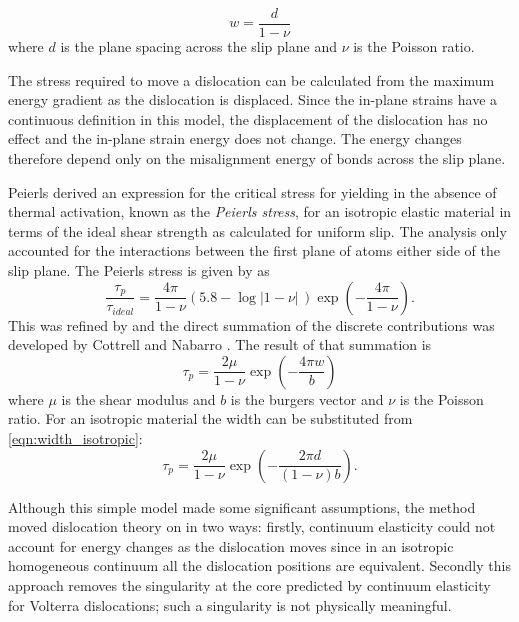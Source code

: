 \begin{equation}
w = \frac{d}{1-\nu}
\label{eqn:width_isotropic}
\end{equation}
where $d$ is the plane spacing across the slip plane and $\nu$ is the Poisson ratio.

The stress required to move a dislocation can be calculated from the maximum energy gradient as the dislocation is displaced. Since the in-plane strains have a continuous definition in this model, the displacement of the dislocation has no effect and the in-plane strain energy does not change. The energy changes therefore depend only on the misalignment energy of bonds across the slip plane.

Peierls derived an expression for the critical stress for yielding in the absence of thermal activation, known as the \emph{Peierls stress}, for an isotropic elastic material in terms of the ideal shear strength as calculated for uniform slip. The analysis only accounted for the interactions between the first plane of atoms either side of the slip plane. The Peierls stress is given by as
\begin{equation}
\frac{\tau_p}{\tau_{ideal}} = \frac{4 \pi}{1 - \nu} (5.8 - \log|1-\nu|\,) \exp\left(-\frac{4\pi}{1 - \nu}\right).
\end{equation}
This was refined by \citet{Nabarro1947} and the direct summation of the discrete contributions was developed by Cottrell and Nabarro \cite{Cottrell1953}. The result of that summation is
\begin{equation}
\tau_p = \frac{2\mu}{1-\nu} \exp\left( - \frac{4\pi w}{b} \right)
\end{equation}
where $\mu$ is the shear modulus and $b$ is the burgers vector and $\nu$ is the Poisson ratio. For an isotropic material the width can be substituted from \autoref{eqn:width_isotropic}:
\begin{equation}
\tau_p = \frac{2\mu}{1-\nu} \exp\left( - \frac{2\pi d}{(1-\nu)b} \right).
\label{eqn:Peierls_Stress}
\end{equation}

Although this simple model made some significant assumptions, the method moved dislocation theory on in two ways: firstly, continuum elasticity could not account for energy changes as the dislocation moves since in an isotropic homogeneous continuum all the dislocation positions are equivalent. Secondly this approach removes the singularity at the core predicted by continuum elasticity for Volterra dislocations; such a singularity is not physically meaningful.



